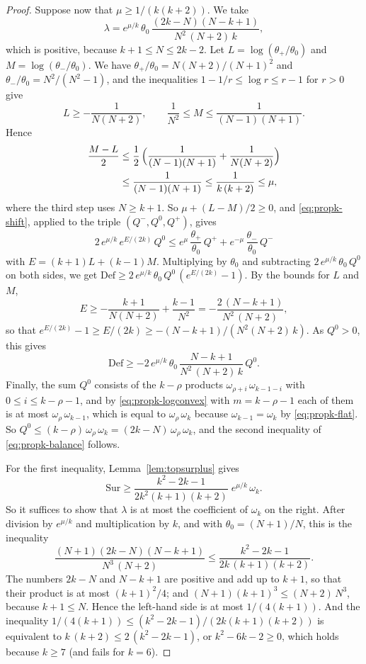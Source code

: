 \documentclass{amsart}
\theoremstyle{definition}
\theoremstyle{remark}
\numberwithin{equation}{section}
\begin{document}
\begin{proof}
Suppose now that $\mu\ge1/(k(k+2))$. We take
\[
\lambda=e^{\mu/k}\,\theta_0\,\frac{(2k-N)(N-k+1)}{N^2\,(N+2)\,k} ,
\]
which is positive, because $k+1\le N\le2k-2$. Let
$L=\log(\theta_+/\theta_0)$ and $M=\log(\theta_-/\theta_0)$. We have
$\theta_+/\theta_0=N(N+2)/(N+1)^2$ and $\theta_-/\theta_0=N^2/(N^2-1)$, and
the inequalities $1-1/r\le\log r\le r-1$ for $r>0$ give
\[
L\ge-\frac{1}{N(N+2)},\qquad
\frac{1}{N^2}\le M\le\frac{1}{(N-1)(N+1)} .
\]
Hence
\begin{align*}
\frac{M-L}{2}
&\le\frac12\,\Bigl(\frac{1}{(N-1)(N+1)}+\frac{1}{N(N+2)}\Bigr)\\
&\le\frac{1}{(N-1)(N+1)}\le\frac{1}{k\,(k+2)}\le\mu ,
\end{align*}
where the third step uses $N\ge k+1$. So $\mu+(L-M)/2\ge0$, and
\eqref{eq:propk-shift}, applied to the triple $(Q^{-},Q^{0},Q^{+})$, gives
\[
2\,e^{\mu/k}\,e^{E/(2k)}\,Q^{0}\le e^{\mu}\,\frac{\theta_+}{\theta_0}\,
Q^{+}+e^{-\mu}\,\frac{\theta_-}{\theta_0}\,Q^{-}
\]
with $E=(k+1)L+(k-1)M$. Multiplying by $\theta_0$ and subtracting
$2\,e^{\mu/k}\,\theta_0\,Q^{0}$ on both sides, we get
$\mathrm{Def}\ge2\,e^{\mu/k}\,\theta_0\,Q^{0}\,(e^{E/(2k)}-1)$. By the
bounds for $L$ and $M$,
\[
E\ge-\frac{k+1}{N(N+2)}+\frac{k-1}{N^2}
=-\frac{2\,(N-k+1)}{N^2\,(N+2)} ,
\]
so that $e^{E/(2k)}-1\ge E/(2k)\ge-(N-k+1)/(N^2(N+2)\,k)$. As
$Q^{0}>0$, this gives
\[
\mathrm{Def}\ge-2\,e^{\mu/k}\,\theta_0\,
\frac{N-k+1}{N^2\,(N+2)\,k}\,Q^{0} .
\]
Finally, the sum $Q^{0}$ consists of the $k-\rho$ products
$\omega_{\rho+i}\,\omega_{k-1-i}$ with $0\le i\le k-\rho-1$, and by
\eqref{eq:propk-logconvex} with $m=k-\rho-1$ each of them is at most
$\omega_\rho\,\omega_{k-1}$, which is equal to $\omega_\rho\,\omega_k$
because $\omega_{k-1}=\omega_k$ by \eqref{eq:propk-flat}. So
$Q^{0}\le(k-\rho)\,\omega_\rho\,\omega_k=(2k-N)\,\omega_\rho\,\omega_k$,
and the second inequality of \eqref{eq:propk-balance} follows.

For the first inequality, Lemma~\ref{lem:topsurplus} gives
\[
\mathrm{Sur}\ge\frac{k^2-2k-1}{2k^2(k+1)(k+2)}\;e^{\mu/k}\,\omega_k .
\]
So it suffices to show that $\lambda$ is at most the coefficient of
$\omega_k$ on the right. After division by $e^{\mu/k}$ and
multiplication by $k$, and with $\theta_0=(N+1)/N$, this is the inequality
\[
\frac{(N+1)(2k-N)(N-k+1)}{N^3\,(N+2)}
\le\frac{k^2-2k-1}{2k\,(k+1)(k+2)} .
\]
The numbers $2k-N$ and $N-k+1$ are positive and add up to $k+1$, so that
their product is at most $(k+1)^2/4$; and
$(N+1)(k+1)^3\le(N+2)\,N^3$, because $k+1\le N$. Hence the left-hand side
is at most $1/(4(k+1))$. And the inequality
$1/(4(k+1))\le(k^2-2k-1)/(2k(k+1)(k+2))$ is equivalent to
$k\,(k+2)\le2\,(k^2-2k-1)$, or $k^2-6k-2\ge0$, which holds because
$k\ge7$ (and fails for $k=6$).
\end{proof}
\end{document}
